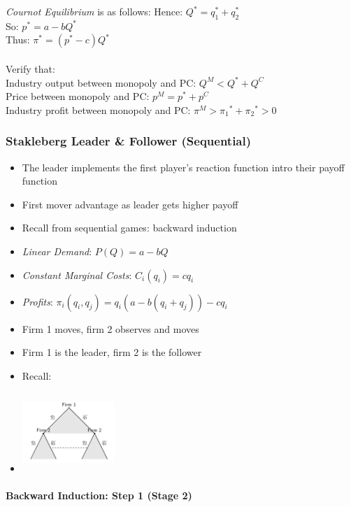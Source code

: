\documentclass[11pt, english]{article}
\begin{document}
	\textit{Cournot Equilibrium} is as follows:
	Hence: $Q^*=q_1^*+q_2^*$\\
	So: $p^*=a-bQ^*$\\
	Thus: $\pi^*=(p^*-c)Q^*$\\

	\\

	Verify that:\\
	Industry output between monopoly and PC: $Q^M<Q^\ast+Q^C$\\
	Price between monopoly and PC: $p^M=p^\ast+p^C$\\
	Industry profit between monopoly and PC: $\pi^M>{\pi_1}^\ast+{\pi_2}^\ast>0$

		\subsubsection{Stakleberg Leader \& Follower (Sequential)}

	\begin{itemize}
	\setlength\itemsep{0cm}
		\item The leader implements the first player’s reaction function intro their payoff function 
		\item First mover advantage as leader gets higher payoff
		\item Recall from sequential games: backward induction
		\item \textit{Linear Demand}: $P(Q)=a-bQ$
		\item \textit{Constant Marginal Costs}: $C_i(q_i)=cq_i$
		\item \textit{Profits}: $\pi_i(q_i,q_j)=q_i\left(a-b(q_i+q_j)\right)-cq_i$
		\item Firm 1 moves, firm 2 observes and moves
		\item Firm 1 is the leader, firm 2 is the follower
		\item Recall:
		\item \includegraphics[width=3.5cm,height=3cm]{EC315-IMG/19.png}
	\end{itemize}

		\paragraph{Backward Induction: Step 1 (Stage 2)}
\end{document}
